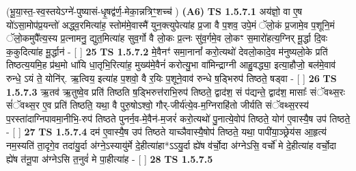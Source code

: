 \documentclass[17pt]{extarticle}
\begin{document}
                  \newline
                      (भू॒या॒स्त॒-स्व॒स्तयेऽग्ने॑-पुष्यासं-धृ॒षद्व॑र्ण॒-मेका॒न्नत्रिꣳ॒॒शच्च॑ )  \textbf{(A6)} \newline \newline
                                        \textbf{ TS 1.5.7.1} \newline
                  अय॑ज्ञो॒ वा ए॒ष यो॑ऽसा॒मोप॑प्र॒यन्तो॑ अद्ध्व॒रमित्या॑ह॒ स्तोम॑मे॒वास्मै॑ युन॒क्त्युपेत्या॑ह प्र॒जा वै प॒शव॒ उपे॒मं ॅलो॒कं प्र॒जामे॒व प॒शूनि॒मं ॅलो॒कमुपै᳚त्य॒स्य प्र॒त्नामनु॒ द्युत॒मित्या॑ह सुव॒र्गो वै लो॒कः प्र॒त्नः सु॑व॒र्गमे॒व लो॒कꣳ स॒मारो॑हत्य॒ग्निर् मू॒र्द्धा दि॒वः क॒कुदित्या॑ह मू॒र्द्धान॑ - [ ] \textbf{  25} \newline
                  \newline
                                \textbf{ TS 1.5.7.2} \newline
                  मे॒वैनꣳ॑ समा॒नानां᳚ करो॒त्यथो॑ देवलो॒कादे॒व म॑नुष्यलो॒के प्रति॑ तिष्ठत्य॒यमि॒ह प्र॑थ॒मो धा॑यि धा॒तृभि॒रित्या॑ह॒ मुख्य॑मे॒वैनं॑ करोत्यु॒भा वा॑मिन्द्राग्नी आहु॒वद्ध्या॒ इत्या॒हौजो॒ बल॑मे॒वाव॑ रुन्धे॒ ऽयं ते॒ योनि॑र्. ऋ॒त्विय॒ इत्या॑ह प॒शवो॒ वै र॒यिः प॒शूने॒वाव॑ रुन्धे ष॒ड्भिरुप॑ तिष्ठते॒ षड्वा - [ ] \textbf{  26} \newline
                  \newline
                                \textbf{ TS 1.5.7.3} \newline
                  ऋ॒तव॑ ऋ॒तुष्वे॒व प्रति॑ तिष्ठति ष॒ड्भिरुत्त॑राभि॒रुप॑ तिष्ठते॒ द्वाद॑श॒ सं प॑द्यन्ते॒ द्वाद॑श॒ मासाः᳚ संॅवथ्स॒रः सं॑ॅवथ्स॒र ए॒व प्रति॑ तिष्ठति॒ यथा॒ वै पुरु॒षोऽश्वो॒ गौर्-जीर्य॑त्ये॒व-म॒ग्निराहि॑तो जीर्यति संॅवथ्स॒रस्य॑ प॒रस्ता॑दाग्निपावमा॒नीभि॒-रुप॑ तिष्ठते पुनर्न॒व-मे॒वैन॑-म॒जरं॑ करो॒त्यथो॑ पु॒नात्ये॒वोप॑ तिष्ठते॒ योग॑ ए॒वास्यै॒ष उप॑ तिष्ठते॒ - [ ] \textbf{  27} \newline
                  \newline
                                \textbf{ TS 1.5.7.4} \newline
                  दम॑ ए॒वास्यै॒ष उप॑ तिष्ठते याच्ञैवास्यै॒षोप॑ तिष्ठते॒ यथा॒ पापी॑या॒ञ्छ्रेय॑स आ॒हृत्य॑ नम॒स्यति॑ ता॒दृगे॒व तदा॑यु॒र्दा अ॑ग्ने॒ऽस्यायु॑र्मे दे॒हीत्या॑हा*ऽऽयु॒र्दा ह्ये॑ष व॑र्चो॒दा अ॑ग्नेऽसि॒ वर्चो॑ मे दे॒हीत्या॑ह वर्चो॒दा ह्ये॑ष त॑नू॒पा अ॑ग्नेऽसि त॒नुवं॑ मे पा॒हीत्या॑ह - [ ] \textbf{  28} \newline
                  \newline
                                \textbf{ TS 1.5.7.5} \newline
\end{document}
